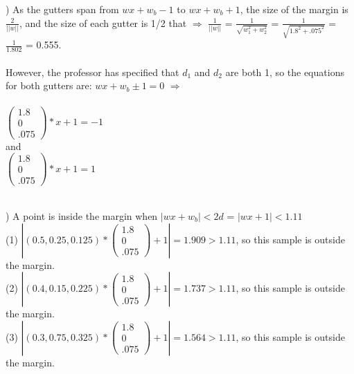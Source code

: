 \documentclass[12pt]{article}
\begin{document}
) As the gutters span from $wx+w_b-1$ to $wx+w_b+1$, the size of the margin is {\Large$\frac{2}{||w||}$}, and the size of each gutter is 1/2 that $\Rightarrow$ {\Large$\frac{1}{||w||}$} = {\Large$\frac{1}{\sqrt{w_1^2+w_2^2}}$} = {\Large$\frac{1}{\sqrt{1.8^2+.075^2}}$} = {\Large$\frac{1}{1.802}$} = 0.555.\\\\
However, the professor has specified that $d_1$ and $d_2$ are both 1, so the equations for both gutters are: $wx+w_b\pm1=0$ $\Rightarrow$\\\\[.4em]$
\begin{pmatrix}
1.8\\ 0\\ .075
\end{pmatrix}
*x + 1 = -1$\\[.4em]
\indent \indent \indent and\\[.4em]$
\begin{pmatrix}
1.8\\ 0\\ .075
\end{pmatrix}
*x + 1 = 1 $\\




\noindent \hrulefill \\\pagebreak



) A point is inside the margin when $|wx+w_b| < 2d$ = $|wx+1| < 1.11$\\[.4em]
\indent (1) $|(0.5, 0.25, 0.125)*
\begin{pmatrix}
1.8\\ 0\\ .075
\end{pmatrix}
 + 1|= 1.909 > 1.11$, so this sample is outside the margin.\\[.4em]

\indent (2) $|(0.4, 0.15, 0.225)*
\begin{pmatrix}
1.8\\ 0\\ .075
\end{pmatrix}
 + 1|= 1.737 > 1.11$, so this sample is outside the margin.\\[.4em]

\indent (3) $|(0.3, 0.75, 0.325)*
\begin{pmatrix}
1.8\\ 0\\ .075
\end{pmatrix}
 + 1|= 1.564 > 1.11$, so this sample is outside the margin.\\[.4em]
\end{document}

